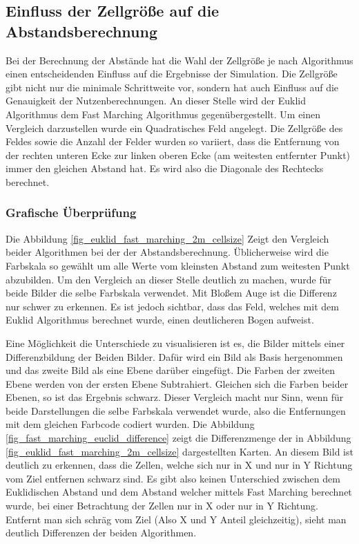 \subsection{Einfluss der Zellgröße auf die Abstandsberechnung}
Bei der Berechnung der Abstände hat die Wahl der Zellgröße je nach Algorithmus einen entscheidenden Einfluss auf die Ergebnisse der Simulation. Die Zellgröße gibt nicht nur die minimale Schrittweite vor, sondern hat auch Einfluss auf die Genauigkeit der Nutzenberechnungen. An dieser Stelle wird der Euklid Algorithmus dem Fast Marching Algorithmus gegenübergestellt. Um einen Vergleich darzustellen wurde ein Quadratisches Feld angelegt. Die Zellgröße des Feldes sowie die Anzahl der Felder wurden so variiert, dass die Entfernung von der rechten unteren Ecke zur linken oberen Ecke (am weitesten entfernter Punkt) immer den gleichen Abstand hat. Es wird also die Diagonale des Rechtecks berechnet. 

\subsubsection{Grafische Überprüfung}
Die Abbildung \ref{fig_euklid_fast_marching_2m_cellsize} Zeigt den Vergleich beider Algorithmen bei der der Abstandsberechnung. Üblicherweise wird die Farbskala so gewählt um alle Werte vom kleinsten Abstand zum weitesten Punkt abzubilden. Um den Vergleich an dieser Stelle deutlich zu machen, wurde für beide Bilder die selbe Farbskala verwendet. Mit Bloßem Auge ist die Differenz nur schwer zu erkennen. Es ist jedoch sichtbar, dass das Feld, welches mit dem Euklid Algorithmus berechnet wurde, einen deutlicheren Bogen aufweist. 

Eine Möglichkeit die Unterschiede zu visualisieren ist es, die Bilder mittels einer Differenzbildung der Beiden Bilder. Dafür wird ein Bild als Basis hergenommen und das zweite Bild als eine Ebene darüber eingefügt. Die Farben der zweiten Ebene werden von der ersten Ebene Subtrahiert. Gleichen sich die Farben beider Ebenen, so ist das Ergebnis schwarz. Dieser Vergleich macht nur Sinn, wenn für beide Darstellungen die selbe Farbskala verwendet wurde, also die Entfernungen mit dem gleichen Farbcode codiert wurden. Die Abbildung \ref{fig_fast_marching_euclid_difference} zeigt die Differenzmenge der in Abbildung \ref{fig_euklid_fast_marching_2m_cellsize} dargestellten Karten.
An diesem Bild ist deutlich zu erkennen, dass die Zellen, welche sich nur in X und nur in Y Richtung vom Ziel entfernen schwarz sind.  Es gibt also keinen Unterschied zwischen dem Euklidischen Abstand und dem Abstand welcher mittels Fast Marching berechnet wurde, bei einer Betrachtung der Zellen nur in X oder nur in Y Richtung. Entfernt man sich schräg vom Ziel (Also X und Y Anteil gleichzeitig), sieht man deutlich Differenzen der beiden Algorithmen. 

